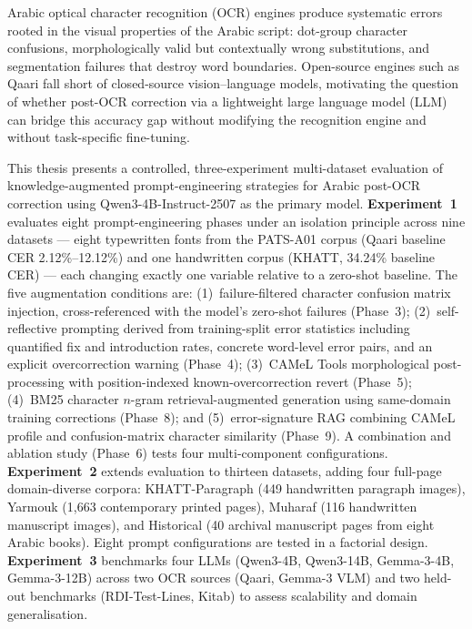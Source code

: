 
Arabic optical character recognition (OCR) engines produce systematic errors
rooted in the visual properties of the Arabic script: dot-group character
confusions, morphologically valid but contextually wrong substitutions, and
segmentation failures that destroy word boundaries. Open-source engines such as
Qaari fall short of closed-source vision--language models, motivating the
question of whether post-OCR correction via a lightweight large language model
(LLM) can bridge this accuracy gap without modifying the recognition engine
and without task-specific fine-tuning.

This thesis presents a controlled, three-experiment multi-dataset evaluation of
knowledge-augmented prompt-engineering strategies for Arabic post-OCR correction
using Qwen3-4B-Instruct-2507 as the primary model. \textbf{Experiment~1}
evaluates eight prompt-engineering phases under an isolation principle across
nine datasets --- eight typewritten fonts from the PATS-A01 corpus (Qaari
baseline CER 2.12\%--12.12\%) and one handwritten corpus (KHATT, 34.24\%
baseline CER) --- each changing exactly one variable relative to a zero-shot
baseline. The five augmentation conditions are: (1)~failure-filtered character
confusion matrix injection, cross-referenced with the model's zero-shot
failures (Phase~3); (2)~self-reflective prompting derived from training-split
error statistics including quantified fix and introduction rates, concrete
word-level error pairs, and an explicit overcorrection warning (Phase~4);
(3)~CAMeL Tools morphological post-processing with position-indexed
known-overcorrection revert (Phase~5); (4)~BM25 character $n$-gram
retrieval-augmented generation using same-domain training corrections (Phase~8);
and (5)~error-signature RAG combining CAMeL profile and confusion-matrix
character similarity (Phase~9). A combination and ablation study (Phase~6)
tests four multi-component configurations. \textbf{Experiment~2} extends
evaluation to thirteen datasets, adding four full-page domain-diverse corpora:
KHATT-Paragraph (449 handwritten paragraph images), Yarmouk (1{,}663 contemporary
printed pages), Muharaf (116 handwritten manuscript images), and Historical
(40 archival manuscript pages from eight Arabic books). Eight prompt
configurations are tested in a factorial design. \textbf{Experiment~3}
benchmarks four LLMs (Qwen3-4B, Qwen3-14B, Gemma-3-4B, Gemma-3-12B) across
two OCR sources (Qaari, Gemma-3 VLM) and two held-out benchmarks
(RDI-Test-Lines, Kitab) to assess scalability and domain generalisation.


